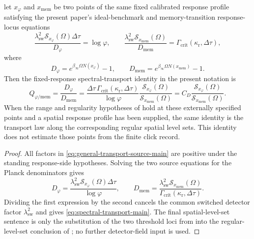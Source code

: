 \begin{corollary}\label{cor:spectral-transport-main}
\ResponseStandingClause let $x_\varphi$ and $x_{\mathrm{mem}}$ be two points of
the same fixed calibrated response profile satisfying the present paper's
ideal-benchmark and memory-transition response-locus equations
\begin{equation}\label{eq:general-transport-source-main}
\frac{\lambda_{\mathrm{sw}}^2\mathcal S_{x_\varphi}(\Omega)\Delta\tau}
     {D_\varphi}
=\log\varphi,
\qquad
\frac{\lambda_{\mathrm{sw}}^2\mathcal S_{x_{\mathrm{mem}}}(\Omega)}
     {D_{\mathrm{mem}}}
=\Gamma_{\mathrm{crit}}(\kappa_{\mathrm r},\Delta\tau),
\end{equation}
where
\[
D_\varphi=e^{\beta_\infty\Omega N(x_\varphi)}-1,
\qquad
D_{\mathrm{mem}}=e^{\beta_\infty\Omega N(x_{\mathrm{mem}})}-1.
\]
Then the fixed-response spectral-transport identity in the present notation is
\begin{equation}\label{eq:spectral-transport-main}
Q_{\varphi/\mathrm{mem}}
=\frac{D_\varphi}{D_{\mathrm{mem}}}
=
\frac{\Delta\tau\,\Gamma_{\mathrm{crit}}(\kappa_{\mathrm r},\Delta\tau)}{\log\varphi}
\frac{\mathcal S_{x_\varphi}(\Omega)}
     {\mathcal S_{x_{\mathrm{mem}}}(\Omega)}
=C_D
\frac{\mathcal S_{x_\varphi}(\Omega)}
     {\mathcal S_{x_{\mathrm{mem}}}(\Omega)} .
\end{equation}
When the range and regularity hypotheses of
 hold at these externally
specified points and a spatial response profile has been supplied, the same
identity is the transport law along the corresponding regular spatial level
sets.  This identity does not estimate those points from the finite click
record.
\end{corollary}

\begin{proof}
All factors in \eqref{eq:general-transport-source-main} are positive under the
standing response-side hypotheses. Solving the two source equations for the
Planck denominators gives
\[
D_\varphi=
\frac{\lambda_{\mathrm{sw}}^2\mathcal S_{x_\varphi}(\Omega)\Delta\tau}
     {\log\varphi},
\qquad
D_{\mathrm{mem}}=
\frac{\lambda_{\mathrm{sw}}^2\mathcal S_{x_{\mathrm{mem}}}(\Omega)}
     {\Gamma_{\mathrm{crit}}(\kappa_{\mathrm r},\Delta\tau)}.
\]
Dividing the first expression by the second cancels the common switched detector
factor $\lambda_{\mathrm{sw}}^2$ and gives \eqref{eq:spectral-transport-main}.
The final spatial-level-set sentence is only the substitution of the two
threshold loci from  into the regular-level-set
conclusion of ; no further detector-field input
is used.
\end{proof}

